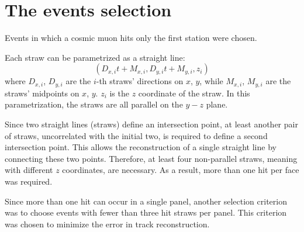 \section{The events selection}\label{eventselection}
Events in which a cosmic muon hits only the 
first station were chosen. 

Each straw can be parametrized as a straight line:
\begin{equation}\label{equaretta}
    (D_{x,i}t+M_{x,i},D_{y,i}t+M_{y,i},z_i)
\end{equation}
where $D_{x,i}$, $D_{y,i}$ are the $i$-th straws' directions on 
$x$, $y$, while $M_{x,i}$, $M_{y,i}$ are the straws' 
midpoints on $x$, $y$. $z_i$ is the $z$ coordinate of the straw.
In this parametrization, the straws are all parallel on the $y-z$ plane.

Since two straight lines (straws) define an intersection point, 
at least another pair of straws, uncorrelated with the initial 
two, is required to define a second intersection point. This 
allows the reconstruction of a single straight line by connecting 
these two points. Therefore, at least four non-parallel straws, 
meaning with different $z$ coordinates, are necessary. As a 
result, more than one hit per face was required.

Since more than one hit can occur in a single panel, 
another selection criterion was to choose events 
with fewer than three hit straws per panel. This 
criterion was chosen to minimize the error in track reconstruction.
